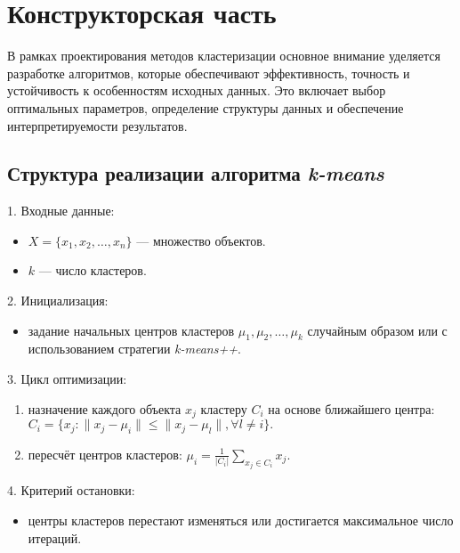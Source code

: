 \chapter{Конструкторская часть}

В рамках проектирования методов кластеризации основное внимание уделяется разработке алгоритмов, которые обеспечивают эффективность, точность и устойчивость к особенностям исходных данных. Это включает выбор оптимальных параметров, определение структуры данных и обеспечение интерпретируемости результатов.

\section{Структура реализации алгоритма \textit{k-means}}
1. Входные данные:
    \begin{itemize}
        \item $X = \{x_1, x_2, \ldots, x_n\}$ — множество объектов.
        \item $k$ — число кластеров.
    \end{itemize}

2. Инициализация:
    \begin{itemize}
        \item задание начальных центров кластеров $\mu_1, \mu_2, \ldots, \mu_k$ случайным образом или с использованием стратегии \textit{k-means++}.
    \end{itemize}

3. Цикл оптимизации:
    \begin{enumerate}
        \item назначение каждого объекта $x_j$ кластеру $C_i$ на основе ближайшего центра:
        \begin{math}
        C_i = \{x_j : \|x_j - \mu_i\| \leq \|x_j - \mu_l\|, \forall l \neq i\}.
        \end{math}\cite{lib:kmeans}
        \item пересчёт центров кластеров:
        \begin{math}
        \mu_i = \frac{1}{|C_i|} \sum_{x_j \in C_i} x_j.
        \end{math}\cite{lib:kmeans}
    \end{enumerate}

4. Критерий остановки:
    \begin{itemize}
        \item центры кластеров перестают изменяться или достигается максимальное число итераций.
    \end{itemize}

